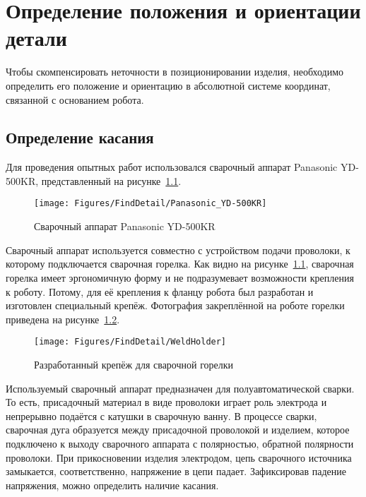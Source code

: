 \chapter{Определение положения и ориентации детали}
Чтобы скомпенсировать неточности в позиционировании изделия, необходимо определить его положение и ориентацию в абсолютной системе координат, связанной с основанием робота.


\section{Определение касания}
Для проведения опытных работ использовался сварочный аппарат Panasonic YD-500KR, представленный на рисунке~\ref{fig:FindDetail:Panasonic_YD-500KR}.

\begin{figure}[H]
    \centering
    \vspace{14pt}
    \texttt{[image: Figures/FindDetail/Panasonic\_YD-500KR]}
    \caption{Сварочный аппарат Panasonic YD-500KR}
    \label{fig:FindDetail:Panasonic_YD-500KR}
\end{figure}

Сварочный аппарат используется совместно с устройством подачи проволоки, к которому подключается сварочная горелка.
Как видно на рисунке~\ref{fig:FindDetail:Panasonic_YD-500KR}, сварочная горелка имеет эргономичную форму и не подразумевает возможности крепления к роботу.
Потому, для её крепления к фланцу робота был разработан и изготовлен специальный крепёж.
Фотография закреплённой на роботе горелки приведена на рисунке~\ref{fig:FindDetail:WeldHolder}.

\begin{figure}[H]
    \centering
    \vspace{14pt}
    \texttt{[image: Figures/FindDetail/WeldHolder]}
    \caption{Разработанный крепёж для сварочной горелки}
    \label{fig:FindDetail:WeldHolder}
\end{figure}

Используемый сварочный аппарат предназначен для полуавтоматической сварки.
То есть, присадочный материал в виде проволоки играет роль электрода и непрерывно подаётся с катушки в сварочную ванну.
В процессе сварки, сварочная дуга образуется между присадочной проволокой и изделием, которое подключено к выходу сварочного аппарата с полярностью, обратной полярности проволоки.
При прикосновении изделия электродом, цепь сварочного источника замыкается, соответственно, напряжение в цепи падает.
Зафиксировав падение напряжения, можно определить наличие касания.

